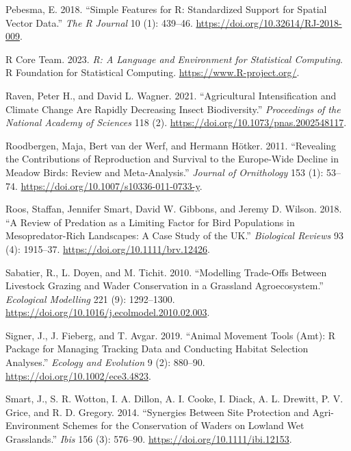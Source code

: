 \documentclass[
  12pt,
  letterpaper,
  DIV=11,
  numbers=noendperiod]{scrartcl}
\newlength{\cslhangindent}
\newenvironment{CSLReferences}[2] %
 {\begin{list}{}{%
  \setlength{\itemindent}{0pt}
  \setlength{\leftmargin}{0pt}
  \setlength{\parsep}{0pt}
  \ifodd #1
   \setlength{\leftmargin}{\cslhangindent}
   \setlength{\itemindent}{-1\cslhangindent}
  \fi
  \setlength{\itemsep}{#2\baselineskip}}}
 {\end{list}}
\begin{document}
\begin{CSLReferences}{1}{0}
Pebesma, E. 2018. {``{Simple Features for R: Standardized Support for
Spatial Vector Data}.''} \emph{{The R Journal}} 10 (1): 439--46.
\url{https://doi.org/10.32614/RJ-2018-009}.

R Core Team. 2023. \emph{R: A Language and Environment for Statistical
Computing}. R Foundation for Statistical Computing.
\url{https://www.R-project.org/}.

Raven, Peter H., and David L. Wagner. 2021. {``Agricultural
Intensification and Climate Change Are Rapidly Decreasing Insect
Biodiversity.''} \emph{Proceedings of the National Academy of Sciences}
118 (2). \url{https://doi.org/10.1073/pnas.2002548117}.

Roodbergen, Maja, Bert van der Werf, and Hermann Hötker. 2011.
{``Revealing the Contributions of Reproduction and Survival to the
Europe-Wide Decline in Meadow Birds: Review and Meta-Analysis.''}
\emph{Journal of Ornithology} 153 (1): 53--74.
\url{https://doi.org/10.1007/s10336-011-0733-y}.

Roos, Staffan, Jennifer Smart, David W. Gibbons, and Jeremy D. Wilson.
2018. {``A Review of Predation as a Limiting Factor for Bird Populations
in Mesopredator{-}Rich Landscapes: A Case Study of the UK.''}
\emph{Biological Reviews} 93 (4): 1915--37.
\url{https://doi.org/10.1111/brv.12426}.

Sabatier, R., L. Doyen, and M. Tichit. 2010. {``Modelling Trade-Offs
Between Livestock Grazing and Wader Conservation in a Grassland
Agroecosystem.''} \emph{Ecological Modelling} 221 (9): 1292--1300.
\url{https://doi.org/10.1016/j.ecolmodel.2010.02.003}.

Signer, J., J. Fieberg, and T. Avgar. 2019. {``Animal Movement Tools
(Amt): R Package for Managing Tracking Data and Conducting Habitat
Selection Analyses.''} \emph{Ecology and Evolution} 9 (2): 880--90.
\url{https://doi.org/10.1002/ece3.4823}.

Smart, J., S. R. Wotton, I. A. Dillon, A. I. Cooke, I. Diack, A. L.
Drewitt, P. V. Grice, and R. D. Gregory. 2014. {``Synergies Between Site
Protection and Agri{-}Environment Schemes for the Conservation of Waders
on Lowland Wet Grasslands.''} \emph{Ibis} 156 (3): 576--90.
\url{https://doi.org/10.1111/ibi.12153}.


\end{CSLReferences}
\end{document}

